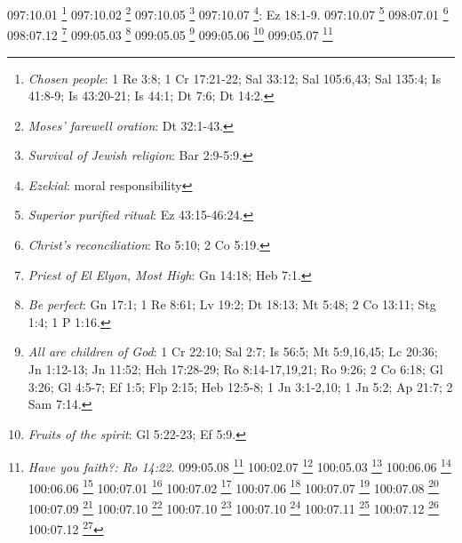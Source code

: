 {{{{{{{{097:10.01 \footnote{\textit{Chosen people}: 1 Re 3:8; 1 Cr 17:21-22; Sal 33:12; Sal 105:6,43; Sal 135:4; Is 41:8-9; Is 43:20-21; Is 44:1; Dt 7:6; Dt 14:2.}
097:10.02 \footnote{\textit{Moses' farewell oration}: Dt 32:1-43.}
097:10.05 \footnote{\textit{Survival of Jewish religion}: Bar 2:9-5:9.}
097:10.07 \footnote{\textit{Ezekial}: moral responsibility}: Ez 18:1-9.}
097:10.07 \footnote{\textit{Superior purified ritual}: Ez 43:15-46:24.}
098:07.01 \footnote{\textit{Christ's reconciliation}: Ro 5:10; 2 Co 5:19.}
098:07.12 \footnote{\textit{Priest of El Elyon, Most High}: Gn 14:18; Heb 7:1.}
099:05.03 \footnote{\textit{Be perfect}: Gn 17:1; 1 Re 8:61; Lv 19:2; Dt 18:13; Mt 5:48; 2 Co 13:11; Stg 1:4; 1 P 1:16.}
099:05.05 \footnote{\textit{All are children of God}: 1 Cr 22:10; Sal 2:7; Is 56:5; Mt 5:9,16,45; Lc 20:36; Jn 1:12-13; Jn 11:52; Hch 17:28-29; Ro 8:14-17,19,21; Ro 9:26; 2 Co 6:18; Gl 3:26; Gl 4:5-7; Ef 1:5; Flp 2:15; Heb 12:5-8; 1 Jn 3:1-2,10; 1 Jn 5:2; Ap 21:7; 2 Sam 7:14.}
099:05.06 \footnote{\textit{Fruits of the spirit}: Gl 5:22-23; Ef 5:9.}
099:05.07 \footnote{\textit{Have you faith?: Ro 14:22.}
099:05.08 \footnote{\textit{Faith defined}: Heb 11:1.}
100:02.07 \footnote{\textit{To a God-knowing believer}: Mt 6:25-34; Mt 10:28; Lc 12:4; Heb 13:6.}
100:05.03 \footnote{\textit{Paul's conversion}: Hch 9:1-9,20.}
100:06.06 \footnote{\textit{I am persuaded--inseparable}: Ro 8:38-39.}
100:06.06 \footnote{\textit{Perfect peace}: Is 26:3; Lc 1:14; Lc 2:14; Jn 14:27; Jn 16:33; Flp 4:7.}
100:07.01 \footnote{\textit{Behold the man}: Jn 19:5.}
100:07.02 \footnote{\textit{He was and is the truth}: Jn 1:17; Jn 14:6.}
100:07.06 \footnote{\textit{Whosoever will may come}: Sal 50:15; Jl 2:32; Zac 13:9; Mt 7:24; Mt 10:32-33; Mt 12:50; Mt 16:24-25; Mc 3:35; Mc 8:34-35; Lc 6:47; Lc 9:23-24; Lc 12:8; Jn 3:15-16; Jn 4:13-14; Jn 11:25-26; Jn 12:46; Hch 2:21; Hch 10:43; Hch 13:26; Ro 9:33; Ro 10:13; 1 Jn 2:23; 1 Jn 4:15; 1 Jn 5:1; Ap 22:17b.}
100:07.07 \footnote{\textit{He trusted God}: Mt 27:43.}
100:07.08 \footnote{\textit{He went about doing good}: Hch 10:38.}
100:07.09 \footnote{\textit{Be of good cheer}: Mt 9:2; Mt 14:27; Mc 6:50; Jn 16:33; Hch 23:11.}
100:07.10 \footnote{\textit{All who seek shall receive}: Mt 7:8; Lc 11:10.}
100:07.10 \footnote{\textit{Freely received, freely give}: Mt 10:8.}
100:07.10 \footnote{\textit{More blessed to give}: Hch 20:35.}
100:07.11 \footnote{\textit{If not so, would have told you}: Jn 14:2.}
100:07.12 \footnote{\textit{Gospel of the kingdom}: Mt 4:23; Mt 9:35; Mt 24:14; Mc 1:14-15.}
100:07.12 \footnote{\textit{His Father's business}: Lc 2:49.}
}}}}}}}}
